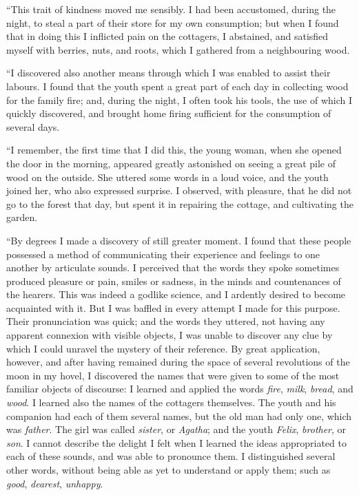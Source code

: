 ``This trait of kindness moved me
sensibly. I had been accustomed,
during the night, to steal a part of their
store for my own consumption; but
when I found that in doing this I inflicted
pain on the cottagers, I abstained,
and satisfied myself with berries, nuts,
and roots, which I gathered from a
neighbouring wood.

``I discovered also another means
through which I was enabled to assist
their labours. I found that the youth
spent a great part of each day in collecting
wood for the family fire; and, during
the night, I often took his tools, the use
of which I quickly discovered, and
brought home firing sufficient for the
consumption of several days.

``I remember, the first time that I
did this, the young woman, when she
opened the door in the morning, appeared
greatly astonished on seeing a
great pile of wood on the outside. She
uttered some words in a loud voice,
and the youth joined her, who also
expressed surprise. I observed, with
pleasure, that he did not go to the
forest that day, but spent it in repairing
the cottage, and cultivating the
garden.

``By degrees I made a discovery of
still greater moment. I found that
these people possessed a method of
communicating their experience and
feelings to one another by articulate
sounds. I perceived that the words
they spoke sometimes produced pleasure
or pain, smiles or sadness, in the
minds and countenances of the hearers.
This was indeed a godlike science, and
I ardently desired to become acquainted
with it. But I was baffled in every attempt
I made for this purpose. Their
pronunciation was quick; and the
words they uttered, not having any
apparent connexion with visible objects,
I was unable to discover any clue
by which I could unravel the mystery
of their reference. By great application,
however, and after having remained
during the space of several
revolutions of the moon in my hovel, I
discovered the names that were given
to some of the most familiar objects of
discourse: I learned and applied the
words \emph{fire}, \emph{milk}, \emph{bread}, and \emph{wood}. I
learned also the names of the cottagers
themselves. The youth and his companion
had each of them several names,
but the old man had only one, which
was \emph{father}. The girl was called \emph{sister},
or \emph{Agatha}; and the youth \emph{Felix}, \emph{brother},
or \emph{son}. I cannot describe the delight
I felt when I learned the ideas appropriated
to each of these sounds, and
was able to pronounce them. I distinguished
several other words, without
being able as yet to understand or apply
them; such as \emph{good}, \emph{dearest}, \emph{unhappy}.


